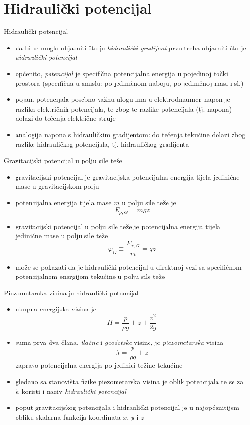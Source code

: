 \documentclass{beamer}
\begin{document}
\section{Hidraulički potencijal}
\begin{frame}{Hidraulički potencijal}
\begin{itemize}
\item da bi se moglo objasniti što je \emph{\alert{\emph{hidraulički gradijent}}}
prvo treba objasniti što je \emph{\alert{\emph{hidraulički potencijal}}} 
\item općenito, \emph{\alert{\emph{potencijal}}} je specifična potencijalna
energija u pojedinoj točki prostora (specifična u smislu: po jediničnom
naboju, po jediničnoj masi i sl.) 
\item pojam potencijala posebno važnu ulogu ima u elektrodinamici: napon
je razlika električnih potencijala, te zbog te razlike potencijala
(tj. napona) dolazi do tečenja električne struje 
\item analogija napona s hidrauličkim gradijentom: do tečenja tekućine dolazi
zbog razlike hidrauličkog potencijala, tj. hidrauličkog gradijenta 
\end{itemize}
\end{frame}
%
\begin{frame}{Gravitacijski potencijal u polju sile teže}
\begin{itemize}
\item gravitacijski potencijal je gravitacijska potencijalna energija tijela
jedinične mase u gravitacijskom polju 
\item potencijalna energija tijela mase $m$ u polju sile teže je 
\[
E_{p,G}=mgz
\]
\item gravitacijski potencijal u polju sile teže je potencijalna energija
tijela jedinične mase u polju sile teže 
\[
\varphi_{G}\equiv\frac{E_{p,G}}{m}=gz
\]
\item može se pokazati da je hidraulički potencijal u direktnoj vezi sa
specifičnom potencijalnom energijom tekućine u polju sile teže 
\end{itemize}
\end{frame}
%
\begin{frame}{Piezometarska visina je hidraulički potencijal}
\begin{itemize}
\item ukupna energijska visina je 
\[
H=\frac{p}{\rho g}+z+\frac{\bar{v}^{2}}{2g}
\]
\item suma prva dva člana, \emph{tlačne} i \emph{geodetske} visine, je \emph{piezometarska}
visina 
\[
h=\frac{p}{\rho g}+z
\]
zapravo potencijalna energija po jedinici težine tekućine 
\item gledano sa stanovišta fizike piezometarska visina je oblik potencijala
te se za $h$ koristi i naziv \emph{\alert{\emph{hidraulički potencijal}}} 
\item poput gravitacijskog potencijala i hidraulički potencijal je u najopćenitijem
obliku skalarna funkcija koordinata $x$, $y$ i $z$ 
\end{itemize}
\end{frame}
\end{document}
